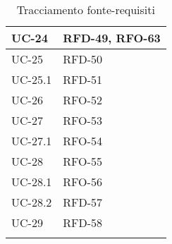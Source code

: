 \begin{xltabular}{\textwidth}{|X| X |}
    \hline
    UC-24 & RFD-49, \newline RFO-63 \\
    \hline
    UC-25 & RFD-50  \\
    \hline
    UC-25.1 & RFD-51  \\
    \hline
    UC-26 & RFO-52 \\
    \hline
    UC-27 & RFO-53  \\
    \hline
    UC-27.1 & RFO-54 \\
    \hline
    UC-28 & RFO-55  \\
    \hline
    UC-28.1 & RFO-56 \\
    \hline
    UC-28.2 & RFD-57 \\
    \hline
    UC-29 & RFD-58 \\
   \hline
     \caption{Tracciamento fonte-requisiti}
    \label{tab:riepilogo}
\end{xltabular}


